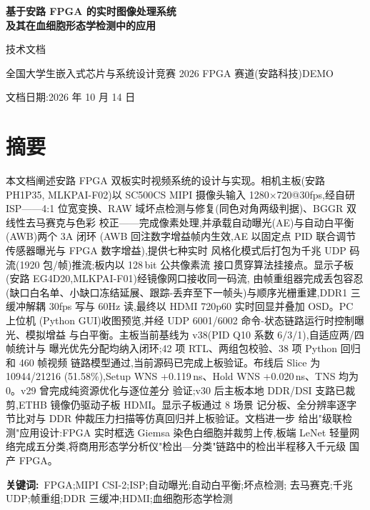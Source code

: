 \documentclass[11pt,a4paper]{report}
\begin{document}
\begin{titlepage}
\centering
\vspace*{2.5cm}
{\huge\bfseries 基于安路 FPGA 的实时图像处理系统\\[8pt]及其在血细胞形态学检测中的应用\par}
\vspace{22pt}
{\LARGE 技术文档\par}
\vspace{36pt}
{\small 全国大学生嵌入式芯片与系统设计竞赛 2026 FPGA 赛道(安路科技)\quad DEMO\par}
\vspace{4pt}
{\small 文档日期:2026 年 10 月 14 日\par}
\vfill
\end{titlepage}

\chapter*{摘要}

本文档阐述安路 FPGA 双板实时视频系统的设计与实现。相机主板(安路 PH1P35,
MLKPAI-F02)以 SC500CS MIPI 摄像头输入 1280$\times$720@30fps,经自研 ISP——4:1
位宽变换、RAW 域坏点检测与修复(同色对角两级判据)、BGGR 双线性去马赛克与色彩
校正——完成像素处理,并承载自动曝光(AE)与自动白平衡(AWB)两个 3A 闭环
(AWB 回注数字增益帧内生效,AE 以固定点 PID 联合调节传感器曝光与 FPGA 数字增益),提供七种实时
风格化模式后打包为千兆 UDP 码流(1920 包/帧)推流;板内以 128\,bit 公共像素流
接口贯穿算法挂接点。显示子板(安路 EG4D20,MLKPAI-F01)经镜像网口接收同一码流,
由帧重组器完成丢包容忍(缺口白名单、小缺口冻结延展、跟踪-丢弃至下一帧头)与顺序光栅重建,DDR1
三缓冲解耦 30fps 写与 60Hz 读,最终以 HDMI 720p60 实时回显并叠加 OSD。PC 上位机
(Python GUI)收图预览,并经 UDP 6001/6002 命令-状态链路运行时控制曝光、模拟增益
与白平衡。主板当前基线为 v38(PID Q10 系数 6/3/1),自适应两/四帧统计与
曝光优先分配均纳入闭环;42 项 RTL、两组包校验、38 项 Python 回归和 460 帧视频
链路模型通过,当前源码已完成上板验证。布线后 Slice 为 10944/21216 (51.58\%),Setup WNS
+0.119\,ns、Hold WNS +0.020\,ns、TNS 均为 0。v29 曾完成纯资源优化与逐位差分
验证;v30 后主板本地 DDR/DSI 支路已裁剪,ETHB 镜像仍驱动子板 HDMI。显示子板通过 8 场景
记分板、全分辨率逐字节比对与 DDR 仲裁压力扫描等仿真回归并上板验证。文档进一步
给出"级联检测"应用设计:FPGA 实时框选 Giemsa 染色白细胞并裁剪上传,板端 LeNet
轻量网络完成五分类,将商用形态学分析仪"检出—分类"链路中的检出半程移入千元级
国产 FPGA。

\vspace{1em}
\noindent\textbf{关键词:}\ FPGA;MIPI CSI-2;ISP;自动曝光;自动白平衡;坏点检测;
去马赛克;千兆 UDP;帧重组;DDR 三缓冲;HDMI;血细胞形态学检测

\tableofcontents
\clearpage
{}
\setcounter{page}{1}







\end{document}
